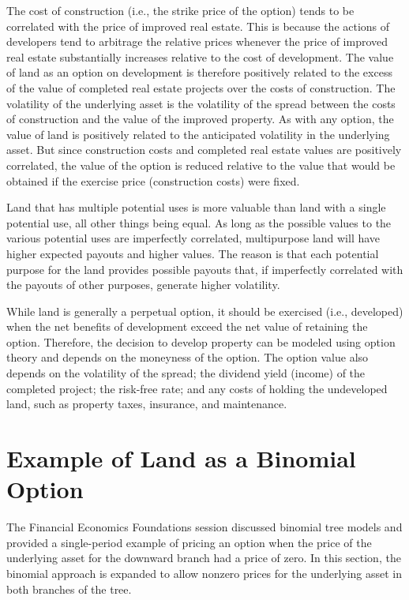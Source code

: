 \documentclass[11pt]{article}
\begin{document}
The cost of construction (i.e., the strike price of the option) tends to be correlated with the price of improved real estate. This is because the actions of developers tend to arbitrage the relative prices whenever the price of improved real estate substantially increases relative to the cost of development. The value of land as an option on development is therefore positively related to the excess of the value of completed real estate projects over the costs of construction. The volatility of the underlying asset is the volatility of the spread between the costs of construction and the value of the improved property. As with any option, the value of land is positively related to the anticipated volatility in the underlying asset. But since construction costs and completed real estate values are positively correlated, the value of the option is reduced relative to the value that would be obtained if the exercise price (construction costs) were fixed.

Land that has multiple potential uses is more valuable than land with a single potential use, all other things being equal. As long as the possible values to the various potential uses are imperfectly correlated, multipurpose land will have higher expected payouts and higher values. The reason is that each potential purpose for the land provides possible payouts that, if imperfectly correlated with the payouts of other purposes, generate higher volatility.

While land is generally a perpetual option, it should be exercised (i.e., developed) when the net benefits of development exceed the net value of retaining the option. Therefore, the decision to develop property can be modeled using option theory and depends on the moneyness of the option. The option value also depends on the volatility of the spread; the dividend yield (income) of the completed project; the risk-free rate; and any costs of holding the undeveloped land, such as property taxes, insurance, and maintenance.

\section*{Example of Land as a Binomial Option}
The Financial Economics Foundations session discussed binomial tree models and provided a single-period example of pricing an option when the price of the underlying asset for the downward branch had a price of zero. In this section, the binomial approach is expanded to allow nonzero prices for the underlying asset in both branches of the tree.
\end{document}
